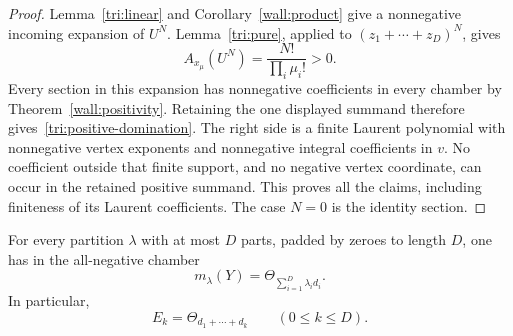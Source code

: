 \begin{proof}
Lemma~\ref{tri:linear} and Corollary~\ref{wall:product} give a
nonnegative incoming expansion of $U^N$.
Lemma~\ref{tri:pure}, applied to $(z_1+\cdots+z_D)^N$, gives
\[
 A_{x_\mu}(U^N)=\frac{N!}{\prod_i\mu_i!}>0.
\]
Every section in this expansion has nonnegative coefficients in
every chamber by Theorem~\ref{wall:positivity}.  Retaining the one
displayed summand therefore gives~\eqref{tri:positive-domination}.
The right side is a finite Laurent polynomial with nonnegative
vertex exponents and nonnegative integral coefficients in $v$.
No coefficient outside that finite support, and no negative
vertex coordinate, can occur in the retained positive summand.
This proves all the claims, including finiteness of its Laurent
coefficients.  The case $N=0$ is the identity section.
\end{proof}

\begin{theorem}\label{tri:monomial}
For every partition $\lambda$ with at most $D$ parts, padded by
zeroes to length $D$, one has in the all-negative chamber
\begin{equation}\label{tri:monomial-identity}
 m_\lambda(Y)=\Theta_{\sum_{i=1}^D\lambda_i d_i}.
\end{equation}
In particular,
\begin{equation}\label{tri:elementary-identity}
 E_k=\Theta_{d_1+\cdots+d_k}\qquad(0\leq k\leq D).
\end{equation}
\end{theorem}


